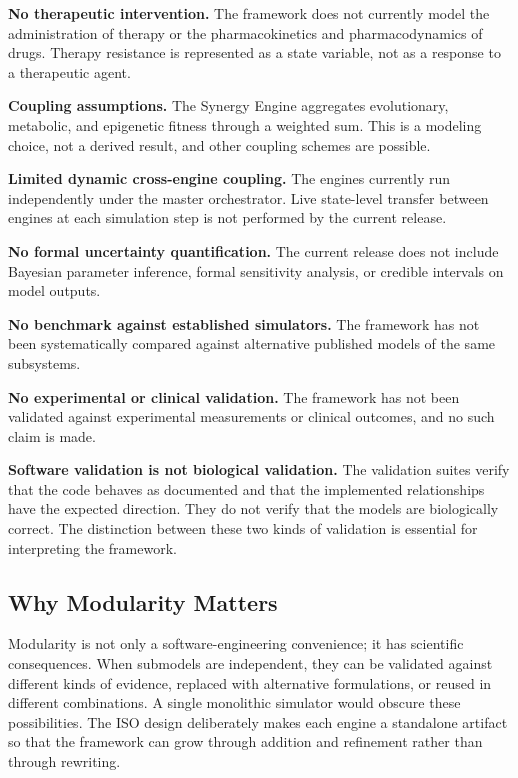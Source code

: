 \documentclass[12pt,a4paper]{article}
\begin{document}
\textbf{No therapeutic intervention.} The framework does not currently model the administration of therapy or the pharmacokinetics and pharmacodynamics of drugs. Therapy resistance is represented as a state variable, not as a response to a therapeutic agent.

\textbf{Coupling assumptions.} The Synergy Engine aggregates evolutionary, metabolic, and epigenetic fitness through a weighted sum. This is a modeling choice, not a derived result, and other coupling schemes are possible.

\textbf{Limited dynamic cross-engine coupling.} The engines currently run independently under the master orchestrator. Live state-level transfer between engines at each simulation step is not performed by the current release.

\textbf{No formal uncertainty quantification.} The current release does not include Bayesian parameter inference, formal sensitivity analysis, or credible intervals on model outputs.

\textbf{No benchmark against established simulators.} The framework has not been systematically compared against alternative published models of the same subsystems.

\textbf{No experimental or clinical validation.} The framework has not been validated against experimental measurements or clinical outcomes, and no such claim is made.

\textbf{Software validation is not biological validation.} The validation suites verify that the code behaves as documented and that the implemented relationships have the expected direction. They do not verify that the models are biologically correct. The distinction between these two kinds of validation is essential for interpreting the framework.

\subsection{Why Modularity Matters}

Modularity is not only a software-engineering convenience; it has scientific consequences. When submodels are independent, they can be validated against different kinds of evidence, replaced with alternative formulations, or reused in different combinations. A single monolithic simulator would obscure these possibilities. The ISO design deliberately makes each engine a standalone artifact so that the framework can grow through addition and refinement rather than through rewriting.
\end{document}
